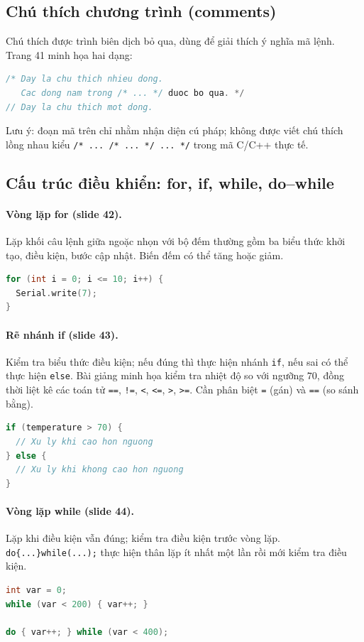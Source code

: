\subsection{Chú thích chương trình (comments)}
Chú thích được trình biên dịch bỏ qua, dùng để giải thích ý nghĩa mã lệnh. Trang 41 minh họa hai dạng:
\begin{lstlisting}[language=C++]
/* Day la chu thich nhieu dong.
   Cac dong nam trong /* ... */ duoc bo qua. */
// Day la chu thich mot dong.
\end{lstlisting}
\noindent Lưu ý: đoạn mã trên chỉ nhằm nhận diện cú pháp; không được viết chú thích lồng nhau kiểu \texttt{/* ... /* ... */ ... */} trong mã C/C++ thực tế.
\subsection{Cấu trúc điều khiển: for, if, while, do--while}
\paragraph{Vòng lặp for (slide 42).} Lặp khối câu lệnh giữa ngoặc nhọn với bộ đếm thường gồm ba biểu thức khởi tạo, điều kiện, bước cập nhật. Biến đếm có thể tăng hoặc giảm.
\begin{lstlisting}[language=C++]
for (int i = 0; i <= 10; i++) {
  Serial.write(7);
}
\end{lstlisting}
\paragraph{Rẽ nhánh if (slide 43).} Kiểm tra biểu thức điều kiện; nếu đúng thì thực hiện nhánh \texttt{if}, nếu sai có thể thực hiện \texttt{else}. Bài giảng minh họa kiểm tra nhiệt độ so với ngưỡng \(70\), đồng thời liệt kê các toán tử \texttt{==}, \texttt{!=}, \texttt{<}, \texttt{<=}, \texttt{>}, \texttt{>=}. Cần phân biệt \texttt{=} (gán) và \texttt{==} (so sánh bằng).
\begin{lstlisting}[language=C++]
if (temperature > 70) {
  // Xu ly khi cao hon nguong
} else {
  // Xu ly khi khong cao hon nguong
}
\end{lstlisting}
\paragraph{Vòng lặp while (slide 44).} Lặp khi điều kiện vẫn đúng; kiểm tra điều kiện trước vòng lặp. \texttt{do\{...\}while(...);} thực hiện thân lặp ít nhất một lần rồi mới kiểm tra điều kiện.
\begin{lstlisting}[language=C++]
int var = 0;
while (var < 200) { var++; }

do { var++; } while (var < 400);
\end{lstlisting}
